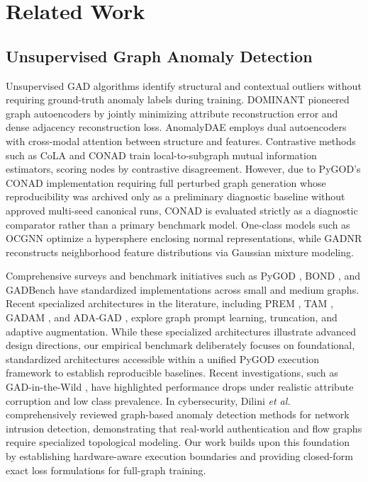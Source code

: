 \documentclass[11pt,a4paper]{article}
\newcommand{\etal}{\emph{et al.}}
\begin{document}
\section{Related Work}
\label{sec:related}

\subsection{Unsupervised Graph Anomaly Detection}
Unsupervised GAD algorithms identify structural and contextual outliers without requiring ground-truth anomaly labels during training. DOMINANT \cite{ding2019deep} pioneered graph autoencoders by jointly minimizing attribute reconstruction error and dense adjacency reconstruction loss. AnomalyDAE \cite{fan2020anomalydae} employs dual autoencoders with cross-modal attention between structure and features. Contrastive methods such as CoLA \cite{liu2022cola} and CONAD \cite{xu2022conad} train local-to-subgraph mutual information estimators, scoring nodes by contrastive disagreement. However, due to PyGOD's CONAD implementation requiring full perturbed graph generation whose reproducibility was archived only as a preliminary diagnostic baseline without approved multi-seed canonical runs, CONAD is evaluated strictly as a diagnostic comparator rather than a primary benchmark model. One-class models such as OCGNN \cite{wang2021ocgnn} optimize a hypersphere enclosing normal representations, while GADNR \cite{roy2024gadnr} reconstructs neighborhood feature distributions via Gaussian mixture modeling. 

Comprehensive surveys \cite{ma2023survey,qiao2025survey} and benchmark initiatives such as PyGOD \cite{liu2024pygod}, BOND \cite{liu2022bond}, and GADBench \cite{tang2023gadbench} have standardized implementations across small and medium graphs. Recent specialized architectures in the literature, including PREM \cite{pan2023prem}, TAM \cite{qiao2023tam}, GADAM \cite{chen2024gadam}, and ADA-GAD \cite{he2024adag}, explore graph prompt learning, truncation, and adaptive augmentation. While these specialized architectures illustrate advanced design directions, our empirical benchmark deliberately focuses on foundational, standardized architectures accessible within a unified PyGOD execution framework to establish reproducible baselines. Recent investigations, such as GAD-in-the-Wild \cite{zhou2026wild}, have highlighted performance drops under realistic attribute corruption and low class prevalence. In cybersecurity, Dilini \etal\ \cite{dilini2026comprehensive} comprehensively reviewed graph-based anomaly detection methods for network intrusion detection, demonstrating that real-world authentication and flow graphs require specialized topological modeling. Our work builds upon this foundation by establishing hardware-aware execution boundaries and providing closed-form exact loss formulations for full-graph training.
\end{document}
